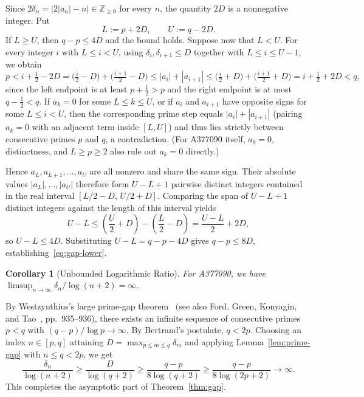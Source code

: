 \documentclass[11pt,a4paper]{article}
\makeatletter
\theoremstyle{entheorem}
\newtheorem{corollary}[lemma]{Corollary}
\theoremstyle{enremark}
\renewenvironment{proof}[1][\proofname]{\par
  \pushQED{\qed}%
  \normalfont\topsep5\p@\@plus4\p@\relax
  \trivlist
  \item[\hskip\labelsep\bfseries\sffamily\color{ink}#1\@addpunct{.}]\ignorespaces
}{%
  \popQED\endtrivlist\@endpefalse
}
\newcommand{\Z}{\mathbb{Z}}
\newcommand{\de}{\delta}
\makeatother
\begin{document}
\begin{proof}
Since $2\de_n = \bigl|2|a_n| - n\bigr| \in \Z_{\ge 0}$ for every $n$, the quantity $2D$ is a nonnegative integer. Put
\[
  L := p + 2D, \qquad U := q - 2D.
\]
If $L \ge U$, then $q - p \le 4D$ and the bound holds. Suppose now that $L < U$. For every integer $i$ with $L \le i < U$, using $\de_i, \de_{i+1} \le D$ together with $L \le i \le U - 1$, we obtain
\[
  p < i + \tfrac{1}{2} - 2D = \bigl(\tfrac{i}{2} - D\bigr) + \bigl(\tfrac{i+1}{2} - D\bigr)
  \le |a_i| + |a_{i+1}|
  \le \bigl(\tfrac{i}{2} + D\bigr) + \bigl(\tfrac{i+1}{2} + D\bigr) = i + \tfrac{1}{2} + 2D < q,
\]
since the left endpoint is at least $p + \frac{1}{2} > p$ and the right endpoint is at most $q - \frac{1}{2} < q$. If $a_k = 0$ for some $L \le k \le U$, or if $a_i$ and $a_{i+1}$ have opposite signs for some $L \le i < U$, then the corresponding prime step equals $|a_i| + |a_{i+1}|$ (pairing $a_k = 0$ with an adjacent term inside $[L, U]$) and thus lies strictly between consecutive primes $p$ and $q$, a contradiction. (For \textup{A377090} itself, $a_0 = 0$, distinctness, and $L \ge p \ge 2$ also rule out $a_k = 0$ directly.)

Hence $a_L, a_{L+1}, \ldots, a_U$ are all nonzero and share the same sign. Their absolute values $|a_L|, \ldots, |a_U|$ therefore form $U - L + 1$ pairwise distinct integers contained in the real interval $[L/2 - D,\, U/2 + D]$. Comparing the span of $U - L + 1$ distinct integers against the length of this interval yields
\[
  U - L \le \left(\frac{U}{2} + D\right) - \left(\frac{L}{2} - D\right) = \frac{U - L}{2} + 2D,
\]
so $U - L \le 4D$. Substituting $U - L = q - p - 4D$ gives $q - p \le 8D$, establishing~\eqref{eq:gap-lower}.
\end{proof}

\begin{corollary}[Unbounded Logarithmic Ratio]\label{cor:limsup-inf}
For \textup{A377090}, we have $\limsup_{n\to\infty}\de_n/\log(n+2) = \infty$.
\end{corollary}

\begin{proof}
By Westzynthius's large prime-gap theorem~\cite{westzynthius1931} (see also Ford, Green, Konyagin, and Tao~\cite{fgkt2016}, pp.~935--936), there exists an infinite sequence of consecutive primes $p < q$ with $(q - p)/\log p \to \infty$. By Bertrand's postulate, $q < 2p$. Choosing an index $n \in [p, q]$ attaining $D = \max_{p \le m \le q} \de_m$ and applying Lemma~\ref{lem:prime-gap} with $n \le q < 2p$, we get
\[
  \frac{\de_n}{\log(n+2)} \ge \frac{D}{\log(q+2)} \ge \frac{q - p}{8\log(q+2)} \ge \frac{q - p}{8\log(2p+2)} \longrightarrow \infty.
\]
This completes the asymptotic part of Theorem~\ref{thm:gap}.
\end{proof}
\end{document}
